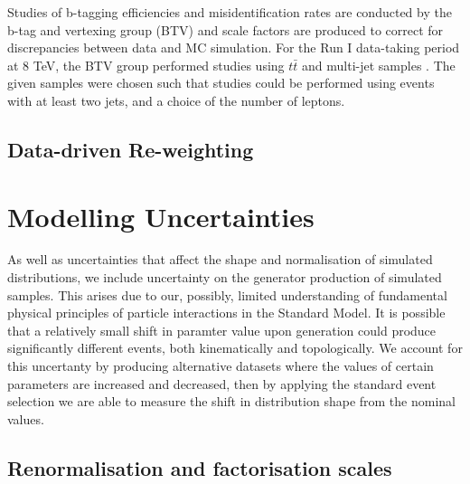 
Studies of b-tagging efficiencies and misidentification rates are conducted by the b-tag and vertexing group (BTV) and scale factors are produced to correct for discrepancies between data and MC simulation. For the Run I data-taking period at 8 TeV, the BTV group performed studies using $t\bar{t}$ and multi-jet samples \cite{BTAGPAS}. The given samples were chosen such that studies could be performed using events with at least two jets, and a choice of the number of leptons. %

\subsection{Data-driven Re-weighting} \label{subsec-DataDriverReweightingUncertainties}




\section{Modelling Uncertainties} \label{sec-ModellingUncertainties}

As well as uncertainties that affect the shape and normalisation of simulated distributions, we include uncertainty on the generator production of simulated samples. This arises due to our, possibly, limited understanding of fundamental physical principles of particle interactions in the Standard Model. It is possible that a relatively small shift in paramter value upon generation could produce significantly different events, both kinematically and topologically. We account for this uncertanty by producing alternative datasets where the values of certain parameters are increased and decreased, then by applying the standard event selection we are able to measure the shift in distribution shape from the nominal values. 

\subsection{Renormalisation and factorisation scales}


